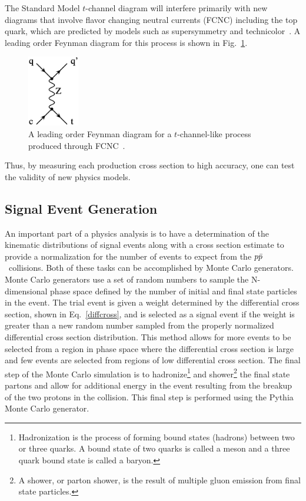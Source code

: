 The Standard Model $t$-channel diagram will interfere primarily with new diagrams that involve flavor changing neutral currents (FCNC) including the top quark, which are predicted by models such as supersymmetry and technicolor~\cite{PhysRevD.63.014018}. A leading order Feynman diagram for this process is shown in Fig.~\ref{tchannelnew}.

\begin{figure}[!h!tbp]
\begin{center}
\includegraphics[width=0.2\textwidth]{eps/Theory/FCNC.eps}
\end{center}
\vspace{-0.1in}
\caption{A leading order Feynman diagram for a $t$-channel-like process produced through FCNC~\cite{Jabeen:2006km}.}
\label{tchannelnew}
\end{figure}

Thus, by measuring each production cross section to high accuracy, one can test the validity of new physics models.



\subsection{Signal Event Generation}
\label{singletopgeneration}

An important part of a physics analysis is to have a determination of the kinematic distributions of signal events along with a cross section estimate to provide a normalization for the number of events to expect from the $\mbox{$p\bar{p}$}$~collisions. Both of these tasks can be accomplished by Monte Carlo generators. Monte Carlo generators use a set of random numbers to sample the N-dimensional phase space defined by the number of initial and final state particles in the event. The trial event is given a weight determined by the differential cross section, shown in Eq.~\ref{diffcross}, and is selected as a signal event if the weight is greater than a new random number sampled from the properly normalized differential cross section distribution. This method allows for more events to be selected from a region in phase space where the differential cross section is large and few events are selected from regions of low differential cross section. The final step of the Monte Carlo simulation is to hadronize\footnote{Hadronization is the process of forming bound states (hadrons) between two or three quarks. A bound state of two quarks is called a meson and a three quark bound state is called a baryon.} and shower\footnote{A shower, or parton shower, is the result of multiple gluon emission from final state particles.} the final state partons and allow for additional energy in the event resulting from the breakup of the two protons in the collision. This final step is performed using the Pythia~\cite{Sjostrand:2001yu} Monte Carlo generator.

